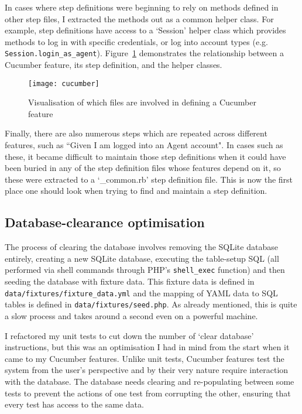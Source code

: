 In cases where step definitions were beginning to rely on methods defined in other step files, I extracted the methods out as a common helper class. For example, step definitions have access to a `Session' helper class which provides methods to log in with specific credentials, or log into account types (e.g. \lstinline{Session.login_as_agent}). Figure~\ref{uml:cucumber} demonstrates the relationship between a Cucumber feature, its step definition, and the helper classes.

\begin{figure}[h!]
  \centering
    \ifimages
    \texttt{[image: cucumber]}
    \fi
  \caption{Visualisation of which files are involved in defining a Cucumber feature}
  \label{uml:cucumber}
\end{figure}

Finally, there are also numerous steps which are repeated across different features, such as ``Given I am logged into an Agent account". In cases such as these, it became difficult to maintain those step definitions when it could have been buried in any of the step definition files whose features depend on it, so these were extracted to a `\_common.rb' step definition file. This is now the first place one should look when trying to find and maintain a step definition.

\subsection{Database-clearance optimisation}

The process of clearing the database involves removing the SQLite database entirely, creating a new SQLite database, executing the table-setup SQL (all performed via shell commands through PHP's \lstinline{shell_exec} function) and then seeding the database with fixture data. This fixture data is defined in \lstinline{data/fixtures/fixture_data.yml} and the mapping of YAML data to SQL tables is defined in \lstinline{data/fixtures/seed.php}. As already mentioned, this is quite a slow process and takes around a second even on a powerful machine.

I refactored my unit tests to cut down the number of `clear database' instructions, but this was an optimisation I had in mind from the start when it came to my Cucumber features. Unlike unit tests, Cucumber features test the system from the user's perspective and by their very nature require interaction with the database. The database needs clearing and re-populating between some tests to prevent the actions of one test from corrupting the other, ensuring that every test has access to the same data.


